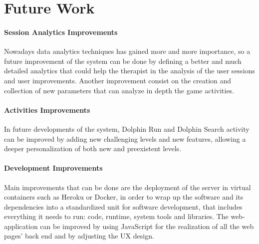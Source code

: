 	\chapter{Future Work}
	
	\subsubsection{\textbf{\Large Session Analytics Improvements}}
	Nowadays data analytics techniques has gained more and more importance, so a future improvement of the system can be done by defining a better and much detailed analytics that could help the therapist in the analysis of the user sessions and user improvements. \newline
	Another improvement consist on the creation and collection of new parameters that can analyze in depth the game activities.
	
	
	\subsubsection{\textbf{\Large Activities Improvements}}
	In future developments of the system, Dolphin Run and Dolphin Search activity can be improved by adding new challenging levels and new features, allowing a deeper personalization of both new and preexistent levels.
	
	\subsubsection{\textbf{\Large Development Improvements}}
	Main improvements that can be done are the deployment of the server in virtual containers such as Heroku or Docker, in order to wrap up  the software and its dependencies into a standardized unit for software development, that includes everything it needs to run: code, runtime, system tools and libraries. \newline
	The web-application can be improved by using JavaScript for the realization of all the web pages' back end and by adjusting the UX design.
	


	
	
	